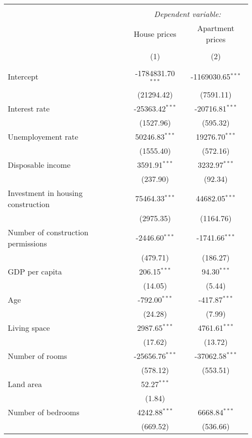 \begin{table}[!htbp] \centering
\begin{tabular}{@{\extracolsep{5pt}}lcc}
\\[-1.8ex]\hline
\hline \\[-1.8ex]
& \multicolumn{2}{c}{\textit{Dependent variable:}} \
\cr \cline{2-3}
\\[-1.8ex] & \multicolumn{1}{c}{House prices} & \multicolumn{1}{c}{Apartment prices}  \\
\\[-1.8ex] & (1) & (2) \\
\hline \\[-1.8ex]
 Intercept & -1784831.70$^{***}$ & -1169030.65$^{***}$ \\
  & (21294.42) & (7591.11) \\
 Interest rate & -25363.42$^{***}$ & -20716.81$^{***}$ \\
  & (1527.96) & (595.32) \\
 Unemployement rate & 50246.83$^{***}$ & 19276.70$^{***}$ \\
  & (1555.40) & (572.16) \\
 Disposable income & 3591.91$^{***}$ & 3232.97$^{***}$ \\
  & (237.90) & (92.34) \\
 Investment in housing construction & 75464.33$^{***}$ & 44682.05$^{***}$ \\
  & (2975.35) & (1164.76) \\
 Number of construction permissions & -2446.60$^{***}$ & -1741.66$^{***}$ \\
  & (479.71) & (186.27) \\
 GDP per capita & 206.15$^{***}$ & 94.30$^{***}$ \\
  & (14.05) & (5.44) \\
 Age & -792.00$^{***}$ & -417.87$^{***}$ \\
  & (24.28) & (7.99) \\
 Living space & 2987.65$^{***}$ & 4761.61$^{***}$ \\
  & (17.62) & (13.72) \\
 Number of rooms & -25656.76$^{***}$ & -37062.58$^{***}$ \\
  & (578.12) & (553.51) \\
 Land area & 52.27$^{***}$ & \\
  & (1.84) & \\
 Number of bedrooms & 4242.88$^{***}$ & 6668.84$^{***}$ \\
  & (669.52) & (536.66) \\

\end{tabular}
\end{table}
